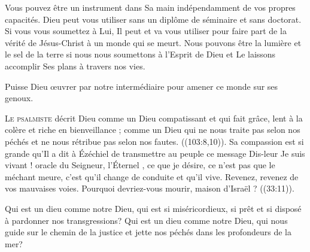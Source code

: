 Vous pouvez être un instrument dans Sa main indépendamment
 de vos propres capacités. Dieu peut vous utiliser sans un diplôme
 de séminaire et sans doctorat. Si vous vous soumettez à Lui,
 Il peut et va vous utiliser pour faire part de la vérité de Jésus-Christ
 à un monde qui se meurt. Nous pouvons être la lumière
 et le sel de la terre si nous nous soumettons à l'Esprit de Dieu
 et Le laissons accomplir Ses plans à travers nos vies. 

Puisse Dieu \oe{}uvrer par notre intermédiaire pour amener ce monde sur ses genoux.

\dvrule






\lettrine{L}{e psalmiste} décrit Dieu comme un Dieu \Og compatissant
 et qui fait grâce, lent à la colère et riche en bienveillance \Fg{} ;
 comme un Dieu \Og qui ne nous traite pas selon nos péchés et ne nous rétribue pas
 selon nos fautes. \Fg{} ((103:8,10)).
 Sa compassion est si grande qu'Il a dit à Ézéchiel de transmettre au peuple
 ce message\frcolon{} Dis-leur\frcolon{}  \Og Je suis vivant !
 \ocadr oracle du Seigneur, l'Éternel \fcadr{}, ce que je désire,
 ce n'est pas que le méchant meure, c'est qu'il change de conduite
 et qu'il vive. Revenez, revenez de vos mauvaises voies.
 Pourquoi devriez-vous mourir, maison d'Israël ? \Fg{} ((33:11)). 


Qui est un dieu comme notre Dieu, qui est si miséricordieux,
 si prêt et si disposé à pardonner nos transgressions?
 Qui est un dieu comme notre Dieu, qui nous guide sur le chemin
 de la justice et jette nos péchés dans les profondeurs de la mer? 

